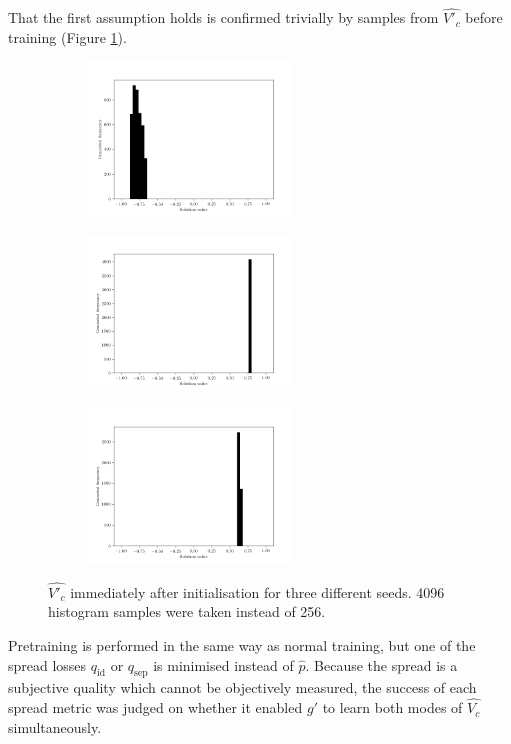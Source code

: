 \documentclass[../../main.tex]{subfiles}
\begin{document}
That the first assumption holds is confirmed trivially by samples from $\hat{V'_c}$ before training (Figure \ref{fig:initialisedGenerator}).
\begin{figure}[H]
    \centering
    \begin{subfigure}[a]{1.\textwidth}
        \centering
        \includegraphics[width=0.6\textwidth]{initialisedGenerator1}
    \end{subfigure}
    \begin{subfigure}[a]{1.\textwidth}
        \centering
        \includegraphics[width=0.6\textwidth]{initialisedGenerator2}
    \end{subfigure}
    \begin{subfigure}[a]{1.\textwidth}
        \centering
        \includegraphics[width=0.6\textwidth]{initialisedGenerator3}
    \end{subfigure}
    \caption[Generator after initialisation]{
        $\hat{V'_c}$ immediately after initialisation for three different seeds.
        4096 histogram samples were taken instead of 256.
    }
\label{fig:initialisedGenerator}
\end{figure}
Pretraining is performed in the same way as normal training, but one of the spread losses $q_\text{id}$ or $q_\text{sep}$ is minimised instead of $\hat{p}$.
Because the spread is a subjective quality which cannot be objectively measured, the success of each spread metric was judged on whether it enabled $g'$ to learn both modes of $\hat{V_c}$ simultaneously.
\end{document}
